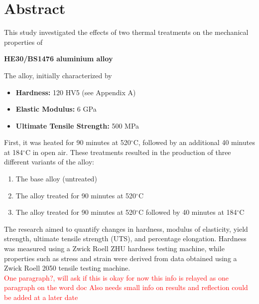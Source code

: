 \documentclass{article}
\begin{document}
    \newpage\vspace*{-5pt}

    \section{Abstract}
   
    This study investigated the effects of two thermal treatments on the mechanical properties of 
    \begin{center}
        \textbf{HE30/BS1476 aluminium alloy}
    \end{center}
    The alloy, initially characterized by \\
    \vspace{-0.5em}
    \begin{center}
         \hspace{5em}
         \begin{minipage}{0.6\textwidth}
            \begin{itemize}[itemsep=-1mm]
                \item \textbf{Hardness:} 120 HV5 (see Appendix A)
                \item \textbf{Elastic Modulus:} 6 GPa
                \item \textbf{Ultimate Tensile Strength:} 500 MPa
            \end{itemize} 
        \end{minipage}        
    \end{center}
    \vspace{0.5em}
    First, it was heated for 90 minutes at 520$^\circ$C, followed by an additional 40 minutes at 184$^\circ$C in open air. These treatments resulted in the production of three different variants of the alloy:
    \begin{enumerate}[itemsep=-1mm]
        \item The base alloy (untreated)
        \item The alloy treated for 90 minutes at 520$^\circ$C
        \item The alloy treated for 90 minutes at 520$^\circ$C followed by 40 minutes at 184$^\circ$C
    \end{enumerate}
    The research aimed to quantify changes in hardness, modulus of elasticity, yield strength, ultimate tensile strength (UTS), and percentage elongation. Hardness was measured using a Zwick Roell ZHU hardness testing machine, while properties such as stress and strain were derived from data obtained using a Zwick Roell 2050 tensile testing machine.\\[8pt]
    \textcolor{red}{One paragraph?, will ask if this is okay for now this info is relayed as one paragraph on the word doc}
    \textcolor{red}{Also needs small info on results and reflection could be added at a later date}
    
\end{document}
